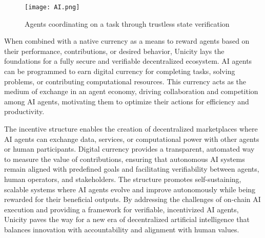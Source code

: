 \documentclass{article}
\begin{document}
\begin{figure}[H]
    \centering
    \texttt{[image: AI.png]}
    \caption{Agents coordinating on a task through trustless state verification }
    \label{fig:ai}
\end{figure}

When combined with a native currency as a means to reward agents based on their performance, contributions, or desired behavior, Unicity lays the foundations for a fully secure and verifiable decentralized ecosystem. AI agents can be programmed to earn digital currency for completing tasks, solving problems, or contributing computational resources. This currency acts as the medium of exchange in an agent economy, driving collaboration and competition among AI agents, motivating them to optimize their actions for efficiency and productivity.

The incentive structure  enables the creation of decentralized marketplaces where AI agents can exchange data, services, or computational power with other agents or human participants. Digital currency provides a transparent, automated way to measure the value of contributions, ensuring that autonomous AI systems remain aligned with predefined goals and facilitating verifiability between agents, human operators, and stakeholders. The structure promotes self-sustaining, scalable systems where AI agents evolve and improve autonomously while being rewarded for their beneficial outputs. By addressing the challenges of on-chain AI execution and providing a framework for verifiable, incentivized AI agents, Unicity paves the way for a new era of decentralized artificial intelligence that balances innovation with accountability and alignment with human values.
\end{document}
